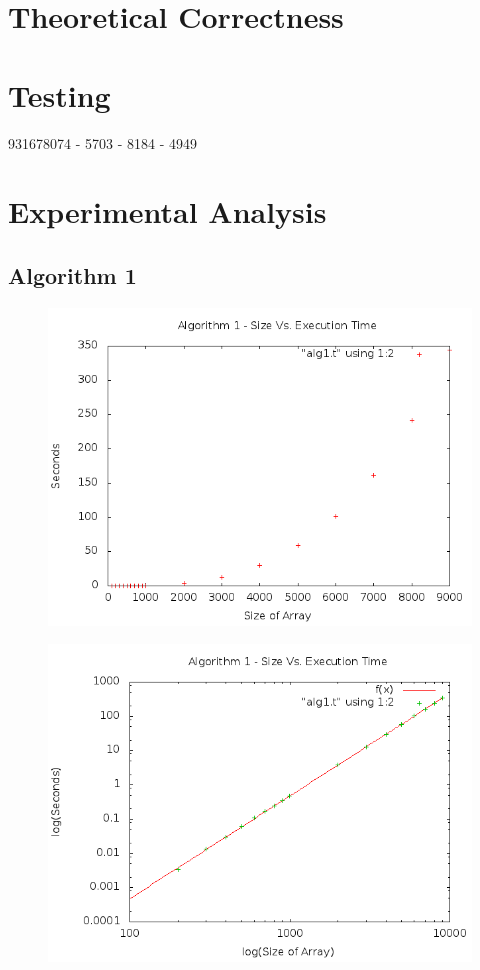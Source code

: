 \documentclass[a4paper,10pt]{article}
\begin{document}
	\section{Theoretical Correctness}

	\section{Testing}
	931678074 - 5703
	 - 8184
	 - 4949 
\newpage
	\section{Experimental Analysis}
		\subsection{Algorithm 1}
		
			\begin{figure}[!htb]
				\centering
				\includegraphics[scale=.5]{timingfiles/alg1plot.png}
			\end{figure}
			\begin{figure}[!htb]
				\centering
				\includegraphics[scale=.5]{timingfiles/alg1plotlog.png}
			\end{figure}
		\newpage
\end{document}
